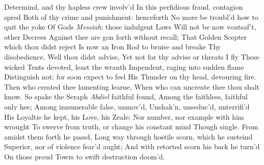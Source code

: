 \documentclass[11pt]{book}
\begin{document}
Determind, and thy hapless crew involv'd 
In this perfidious fraud, contagion spred 
Both of thy crime and punishment: henceforth 
No more be troubl'd how to quit the yoke 
Of Gods \textit{Messiah}; those indulgent Laws 
Will not be now voutsaf't, other Decrees 
Against thee are gon forth without recall; 
That Golden Scepter which thou didst reject 
Is now an Iron Rod to bruise and breake 
Thy disobedience.  Well thou didst advise, 
Yet not for thy advise or threats I fly 
These wicked Tents devoted, least the wrauth 
Impendent, raging into sudden flame 
Distinguish not: for soon expect to feel 
His Thunder on thy head, devouring fire. 
Then who created thee lamenting learne, 
When who can uncreate thee thou shalt know. 
\quad So spake the Seraph \textit{Abdiel} faithful found, 
Among the faithless, faithful only hee; 
Among innumerable false, unmov'd, 
Unshak'n, unseduc'd, unterrifi'd 
His Loyaltie he kept, his Love, his Zeale; 
Nor number, nor example with him wrought 
To swerve from truth, or change his constant mind 
Though single.  From amidst them forth he passd, 
Long way through hostile scorn, which he susteind 
Superior, nor of violence fear'd aught; 
And with retorted scorn his back he turn'd 
On those proud Towrs to swift destruction doom'd. 


\Book
 
\end{document}
